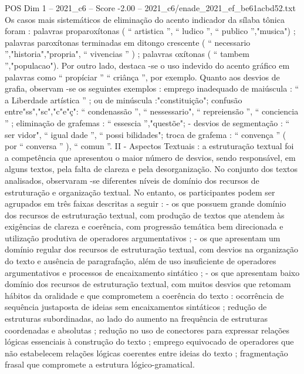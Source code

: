\begin{textsample}{POS Dim 1 – 2021\_c6 – Score -2.00 – 2021\_c6/enade\_2021\_ef\_be61acbd52.txt}
Os casos mais sistemáticos de eliminação do acento indicador da sílaba tônica foram : palavras proparoxítonas ( “ artistica ”, “ ludico ”, “ publico ”,"musica") ; palavras paroxítonas terminadas em ditongo crescente ( “ necessario ”,"historia","propria", “ vivencias ” ) ; palavras oxítonas ( “ tambem ”,"populacao").
Por outro lado, destaca -se o uso indevido do acento gráfico em palavras como “ propíciar ” “ criânça ”, por exemplo.
Quanto aos desvios de grafia, observam -se os seguintes exemplos : emprego inadequado de maiúscula : “ a Liberdade artística ” ; ou de minúscula :"constituição"; confusão entre"ss","sc","c"e"ç": “ condenassão ”, “ nessessario", “ repreiensão ”, “ conciencia ” ; eliminação de grafemas : “ essescia ”,"questõe"; - desvios de segmentação : “ ser vidor", “ igual dade ”, “ possi bilidades"; troca de grafema : “ convença ” ( por “ conversa ” ), “ comun ”.
II - Aspectos Textuais : a estruturação textual foi a competência que apresentou o maior número de desvios, sendo responsável, em alguns textos, pela falta de clareza e pela desorganização.
No conjunto dos textos analisados, observaram -se diferentes níveis de domínio dos recursos de estruturação e organização textual.
No entanto, os participantes podem ser agrupados em três faixas descritas a seguir : - os que possuem grande domínio dos recursos de estruturação textual, com produção de textos que atendem às exigências de clareza e coerência, com progressão temática bem direcionada e utilização produtiva de operadores argumentativos ; - os que apresentam um domínio regular dos recursos de estruturação textual, com desvios na organização do texto e ausência de paragrafação, além de uso insuficiente de operadores argumentativos e processos de encaixamento sintático ; - os que apresentam baixo domínio dos recursos de estruturação textual, com muitos desvios que retomam hábitos da oralidade e que comprometem a coerência do texto : ocorrência de sequência justaposta de ideias sem encaixamentos sintáticos ; redução de estruturas subordinadas, ao lado do aumento na frequência de estruturas coordenadas e absolutas ; redução no uso de conectores para expressar relações lógicas essenciais à construção do texto ; emprego equivocado de operadores que não estabelecem relações lógicas coerentes entre ideias do texto ; fragmentação frasal que compromete a estrutura lógico-gramatical.

\end{textsample}
